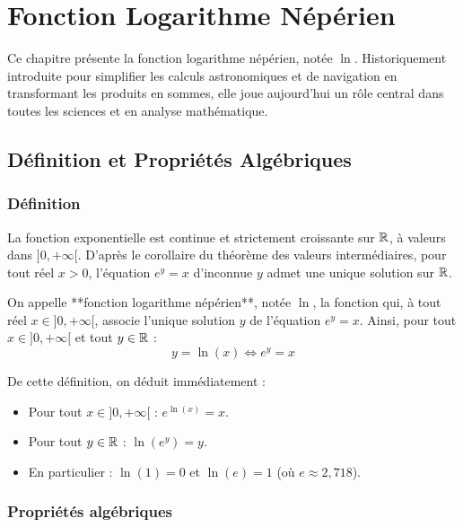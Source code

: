 \chapter{Fonction Logarithme Népérien}

Ce chapitre présente la fonction logarithme népérien, notée $\ln$. Historiquement introduite pour simplifier les calculs astronomiques et de navigation en transformant les produits en sommes, elle joue aujourd'hui un rôle central dans toutes les sciences et en analyse mathématique.

\section{Définition et Propriétés Algébriques}

\subsection{Définition}

La fonction exponentielle est continue et strictement croissante sur $\mathbb{R}$, à valeurs dans $]0, +\infty[$. D'après le corollaire du théorème des valeurs intermédiaires, pour tout réel $x > 0$, l'équation $e^y = x$ d'inconnue $y$ admet une unique solution sur $\mathbb{R}$.

\begin{definition}
On appelle **fonction logarithme népérien**, notée $\ln$, la fonction qui, à tout réel $x \in ]0, +\infty[$, associe l'unique solution $y$ de l'équation $e^y = x$.
Ainsi, pour tout $x \in ]0, +\infty[$ et tout $y \in \mathbb{R}$ :
\[
y = \ln(x) \iff e^y = x
\]
\end{definition}

\begin{propriete}
De cette définition, on déduit immédiatement :
\begin{itemize}
    \item Pour tout $x \in ]0, +\infty[$ : $e^{\ln(x)} = x$.
    \item Pour tout $y \in \mathbb{R}$ : $\ln(e^y) = y$.
    \item En particulier : $\ln(1) = 0$ et $\ln(e) = 1$ (où $e \approx 2,718$).
\end{itemize}
\end{propriete}

\subsection{Propriétés algébriques}


